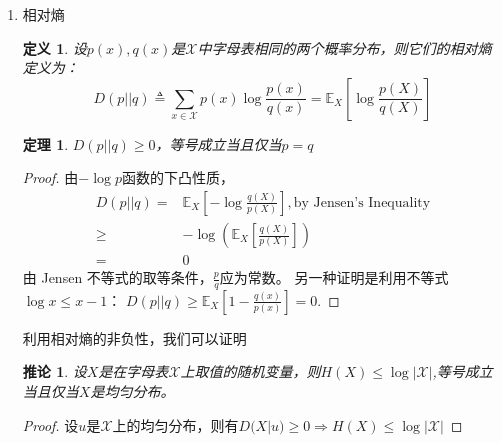 \documentclass{article}
\newtheorem{definition}{定义}
\newtheorem{thm}{定理}
\newtheorem{cor}{推论}
\def\E{\mathbb{E}}
\begin{document}
\begin{enumerate}
关系式：
\begin{itemize}
\item $H(X,Y)=H(X)+H(Y|X)=H(Y)+H(X|Y)$
\begin{proof}
\begin{align*}
H(X,Y)= & -\sum_{x\in \mathcal{X},y\in \mathcal{Y}} p(x,y)\log p(x,y)\\
= & -\sum_{x\in \mathcal{X},y\in \mathcal{Y}} [p(x,y)\log p(y|X=x)+p(x,y)\log p(x)]\\
= & -\sum_{x\in \mathcal{X},y\
in \mathcal{Y}} p(x,y)\log p(y|X=x)-\sum_{x\in \mathcal{X}} p(x)\log p(x)\\
= & H(Y|X)+H(X)
\end{align*}
\end{proof}
\item 记$H(X_1 | X_0)=H(X_1)$,则有
$$
H(X_1,\dots,X_n)=\sum_{i=1}^n H(X_i | X_1,\dots, X_{i-1})
$$
\end{itemize}
\item 相对熵
\begin{definition}
设$p(x),q(x)$是$\mathcal{X}$中字母表相同的两个概率分布，则它们的相对熵定义为：
$$
D(p||q)\triangleq \sum_{x\in \mathcal{X}} p(x)\log\frac{p(x)}{q(x)}
= \E_X[\log\frac{p(X)}{q(X)}]
$$
\end{definition}
\begin{thm}
$D(p||q)\geq 0$，等号成立当且仅当$p=q$
\end{thm}
\begin{proof}
由$-\log p$函数的下凸性质，
\begin{align*}
D(p||q) =& \E_{X}[ -\log\frac{q(X)}{p(X)}],\text{by Jensen's Inequality} \\
\geq &  -\log\left(\E_{X} [\frac{q(X)}{p(X)}]\right)\\
= & 0
\end{align*}
由 Jensen 不等式的取等条件，$\frac{p}{q}$应为常数。
另一种证明是利用不等式 $\log x \leq x - 1$：
$D(p||q) \geq \E_{X}[1 - \frac{q(x)}{p(x)}] = 0$.
\end{proof}
利用相对熵的非负性，我们可以证明
\begin{cor}
设$X$是在字母表$\mathcal{X}$上取值的随机变量，则$H(X)\leq \log|\mathcal{X}|$,等号成立当且仅当$X$是均匀分布。
\end{cor}
\begin{proof}
设$u$是$\mathcal{X}$上的均匀分布，则有$D(X|u)\geq 0 \Rightarrow H(X)\leq \log|\mathcal{X}|$
\end{proof}


\end{enumerate}
\end{document}

